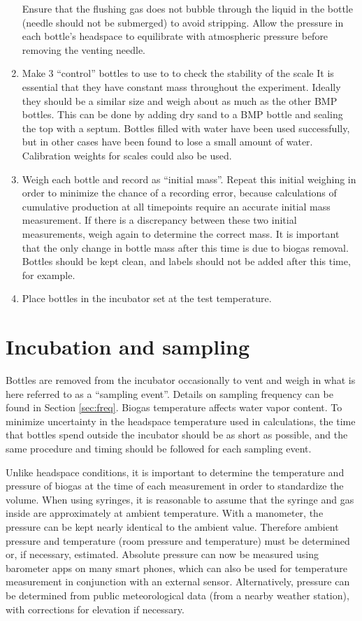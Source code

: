 \documentclass[]{article}
\begin{document}
\begin{enumerate}
      Ensure that the flushing gas does not bubble through the liquid in the bottle (needle should not be submerged) to avoid  stripping. 
      Allow the pressure in each bottle’s headspace to equilibrate with atmospheric pressure before removing the venting needle.
    \item Make 3 ``control'' bottles to use to to check the stability of the scale
      It is essential that they have constant mass throughout the experiment. 
      Ideally they should be a similar size and weigh about as much as the other BMP bottles.
      This can be done by adding dry sand to a BMP bottle and sealing the top with a septum. 
      Bottles filled with water have been used successfully, but in other cases have been found to lose a small amount of water.  
      Calibration weights for scales could also be used.
    \item Weigh each bottle and record as ``initial mass''. 
      Repeat this initial weighing in order to minimize the chance of a recording error, because calculations of cumulative  production at all timepoints require an accurate initial mass measurement.
      If there is a discrepancy between these two initial measurements, weigh again to determine the correct mass.
      It is important that the only change in bottle mass after this time is due to biogas removal.
      Bottles should be kept clean, and labels should not be added after this time, for example.
    \item Place bottles in the incubator set at the test temperature.
\end{enumerate}

\section{Incubation and sampling}
\label{sec:incsam}
Bottles are removed from the incubator occasionally to vent and weigh in what is here referred to as a ``sampling event''.
Details on sampling frequency can be found in Section \ref{sec:freq}.
Biogas temperature affects water vapor content. 
To minimize uncertainty in the headspace temperature used in calculations, the time that bottles spend outside the incubator should be as short as possible, and the same procedure and timing should be followed for each sampling event. 

Unlike headspace conditions, it is important to determine the temperature and pressure of biogas at the time of each measurement in order to standardize the volume.
When using syringes, it is reasonable to assume that the syringe and gas inside are approximately at ambient temperature.
With a manometer, the pressure can be kept nearly identical to the ambient value.
Therefore ambient pressure and temperature (room pressure and temperature) must be determined or, if necessary, estimated.
Absolute pressure can now be measured using barometer apps on many smart phones, which can also be used for temperature measurement in conjunction with an external sensor.
Alternatively, pressure can be determined from public meteorological data (from a nearby weather station), with corrections for elevation if necessary.
\end{document}
